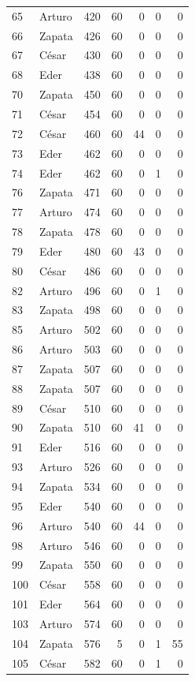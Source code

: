 \begin{longtable}{llrrrrr}
65 & Arturo & 420 & 60 & 0 & 0 & 0 \\
66 & Zapata & 426 & 60 & 0 & 0 & 0 \\
67 & César & 430 & 60 & 0 & 0 & 0 \\
68 & Eder & 438 & 60 & 0 & 0 & 0 \\
70 & Zapata & 450 & 60 & 0 & 0 & 0 \\
71 & César & 454 & 60 & 0 & 0 & 0 \\
72 & César & 460 & 60 & 44 & 0 & 0 \\
73 & Eder & 462 & 60 & 0 & 0 & 0 \\
74 & Eder & 462 & 60 & 0 & 1 & 0 \\
76 & Zapata & 471 & 60 & 0 & 0 & 0 \\
77 & Arturo & 474 & 60 & 0 & 0 & 0 \\
78 & Zapata & 478 & 60 & 0 & 0 & 0 \\
79 & Eder & 480 & 60 & 43 & 0 & 0 \\
80 & César & 486 & 60 & 0 & 0 & 0 \\
82 & Arturo & 496 & 60 & 0 & 1 & 0 \\
83 & Zapata & 498 & 60 & 0 & 0 & 0 \\
85 & Arturo & 502 & 60 & 0 & 0 & 0 \\
86 & Arturo & 503 & 60 & 0 & 0 & 0 \\
87 & Zapata & 507 & 60 & 0 & 0 & 0 \\
88 & Zapata & 507 & 60 & 0 & 0 & 0 \\
89 & César & 510 & 60 & 0 & 0 & 0 \\
90 & Zapata & 510 & 60 & 41 & 0 & 0 \\
91 & Eder & 516 & 60 & 0 & 0 & 0 \\
93 & Arturo & 526 & 60 & 0 & 0 & 0 \\
94 & Zapata & 534 & 60 & 0 & 0 & 0 \\
95 & Eder & 540 & 60 & 0 & 0 & 0 \\
96 & Arturo & 540 & 60 & 44 & 0 & 0 \\
98 & Arturo & 546 & 60 & 0 & 0 & 0 \\
99 & Zapata & 550 & 60 & 0 & 0 & 0 \\
100 & César & 558 & 60 & 0 & 0 & 0 \\
101 & Eder & 564 & 60 & 0 & 0 & 0 \\
103 & Arturo & 574 & 60 & 0 & 0 & 0 \\
104 & Zapata & 576 & 5 & 0 & 1 & 55 \\
105 & César & 582 & 60 & 0 & 1 & 0 \\

\end{longtable}
